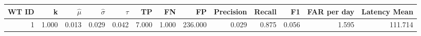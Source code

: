 \begin{tabular}{rrrrrrrrrrrrr}
\toprule
WT ID & k & $\hat\mu$ & $\hat\sigma$ & $\tau$ & TP & FN & FP & Precision & Recall & F1 & FAR per day & Latency Mean \\
\midrule
1 & 1.000 & 0.013 & 0.029 & 0.042 & 7.000 & 1.000 & 236.000 & 0.029 & 0.875 & 0.056 & 1.595 & 111.714 \\
\bottomrule
\end{tabular}
